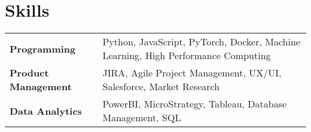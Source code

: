 \documentclass[a4paper,10pt]{article}
\begin{document}
\section{Skills}
\begin{tabularx}{\linewidth}{@{}l X@{}}
\textbf{Programming} &  \normalsize{Python, JavaScript, PyTorch, Docker, Machine Learning, High Performance Computing}\\
\textbf{Product Management}  &  \normalsize{JIRA, Agile Project Management, UX/UI, Salesforce, Market Research}\\  
\textbf{Data Analytics}  &  \normalsize{PowerBI, MicroStrategy, Tableau, Database Management, SQL}\\ 
\end{tabularx}

\vfill
{}
\end{document}
